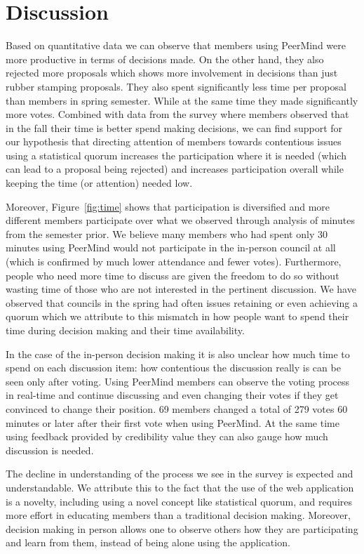 \documentclass[format=acmsmall, review=true, screen=true, anonymous=true]{acmart}
\begin{document}
\section{Discussion}
\label{sec:discussion}

Based on quantitative data we can observe that members using PeerMind were more productive in
terms of decisions made.
On the other hand, they also rejected more proposals which shows more involvement in decisions
than just rubber stamping proposals.
They also spent significantly less time per proposal than members in spring semester.
While at the same time they made significantly more votes.
Combined with data from the survey where members observed that in the fall their time
is better spend making decisions, we can find support for our hypothesis that directing
attention of members towards contentious issues using a statistical quorum increases the
participation where it is needed (which can lead to a proposal being rejected) and
increases participation overall while keeping the time (or attention) needed low.

Moreover, Figure~\ref{fig:time} shows that participation is diversified and more different
members participate over what we observed through analysis of minutes from the semester prior.
We believe many members who had spent only 30 minutes using PeerMind would not participate
in the in-person council at all (which is confirmed by much lower attendance and fewer votes).
Furthermore, people who need more time to discuss are given the freedom to do so without wasting
time of those who are not interested in the pertinent discussion.
We have observed that councils in the spring had often issues retaining or even achieving a
quorum which we attribute to this mismatch in how people want to spend their time during
decision making and their time availability.

In the case of the in-person decision making it is also unclear how much time to spend on each
discussion item: how contentious the discussion really is can be seen only after voting.
Using PeerMind members can observe the voting process in real-time and continue discussing
and even changing their votes if they get convinced to change their position.
69 members changed a total of 279 votes 60 minutes or later after their first vote when
using PeerMind.
At the same time using feedback provided by credibility value they can also gauge how
much discussion is needed.

The decline in understanding of the process we see in the survey is expected and understandable.
We attribute this to the fact that the use of the web application is
a novelty, including using a novel concept like statistical quorum, and requires more effort
in educating members than a traditional decision making.
Moreover, decision making in person allows one to observe others how they are participating and
learn from them, instead of being alone using the application.
\end{document}
